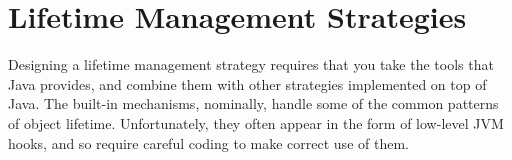 \chapter{Lifetime Management Strategies}

Designing a lifetime management strategy
requires that you take the tools that Java provides, and combine them
with other strategies implemented on top of Java. The built-in mechanisms,
nominally, handle some of the common patterns of object lifetime.
Unfortunately, they often appear in the form of low-level JVM hooks, and so
require careful coding to make correct use of them.  
